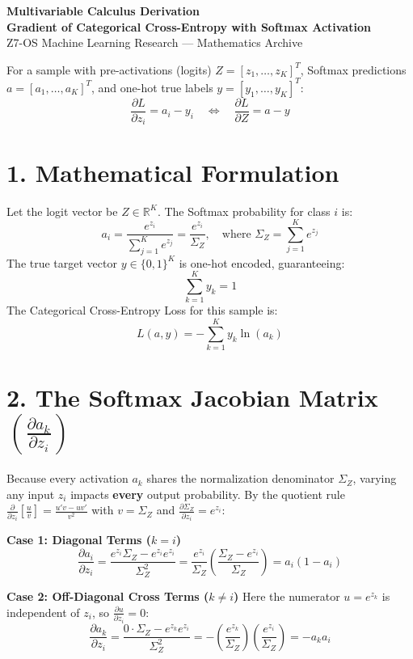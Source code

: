 \documentclass[10pt,a4paper]{article}
\begin{document}
\begin{center}
    {\LARGE \textbf{Multivariable Calculus Derivation}}\\[0.4em]
    {\large \textbf{Gradient of Categorical Cross-Entropy with Softmax Activation}}\\[0.2em]
    {\footnotesize Z7-OS Machine Learning Research --- Mathematics Archive}
\end{center}

\vspace{-0.5em}
\begin{tcolorbox}[colback=boxbg,colframe=primary,title=\textbf{The Fundamental Theorem},arc=2mm]
For a sample with pre-activations (logits) $Z = [z_1, \dots, z_K]^T$, Softmax predictions $a = [a_1, \dots, a_K]^T$, and one-hot true labels $y = [y_1, \dots, y_K]^T$:
\[
\frac{\partial L}{\partial z_i} = a_i - y_i \quad \Longleftrightarrow \quad \frac{\partial L}{\partial Z} = a - y
\]
\end{tcolorbox}

\section*{1. Mathematical Formulation}
Let the logit vector be $Z \in \mathbb{R}^K$. The Softmax probability for class $i$ is:
\[
a_i = \frac{e^{z_i}}{\sum_{j=1}^K e^{z_j}} = \frac{e^{z_i}}{\Sigma_Z}, \quad \text{where } \Sigma_Z = \sum_{j=1}^K e^{z_j}
\]
The true target vector $y \in \{0, 1\}^K$ is one-hot encoded, guaranteeing:
\[
\sum_{k=1}^K y_k = 1
\]
The Categorical Cross-Entropy Loss for this sample is:
\[
L(a, y) = - \sum_{k=1}^K y_k \ln(a_k)
\]

\section*{2. The Softmax Jacobian Matrix $\left(\frac{\partial a_k}{\partial z_i}\right)$}
Because every activation $a_k$ shares the normalization denominator $\Sigma_Z$, varying any input $z_i$ impacts \textbf{every} output probability. By the quotient rule $\frac{\partial}{\partial z_i}\left[\frac{u}{v}\right] = \frac{u'v - uv'}{v^2}$ with $v = \Sigma_Z$ and $\frac{\partial \Sigma_Z}{\partial z_i} = e^{z_i}$:

\textbf{Case 1: Diagonal Terms ($k = i$)}
\[
\frac{\partial a_i}{\partial z_i} = \frac{e^{z_i} \Sigma_Z - e^{z_i} e^{z_i}}{\Sigma_Z^2} = \frac{e^{z_i}}{\Sigma_Z} \left(\frac{\Sigma_Z - e^{z_i}}{\Sigma_Z}\right) = a_i (1 - a_i)
\]

\textbf{Case 2: Off-Diagonal Cross Terms ($k \neq i$)}
Here the numerator $u = e^{z_k}$ is independent of $z_i$, so $\frac{\partial u}{\partial z_i} = 0$:
\[
\frac{\partial a_k}{\partial z_i} = \frac{0 \cdot \Sigma_Z - e^{z_k} e^{z_i}}{\Sigma_Z^2} = - \left(\frac{e^{z_k}}{\Sigma_Z}\right) \left(\frac{e^{z_i}}{\Sigma_Z}\right) = - a_k a_i
\]
\end{document}
